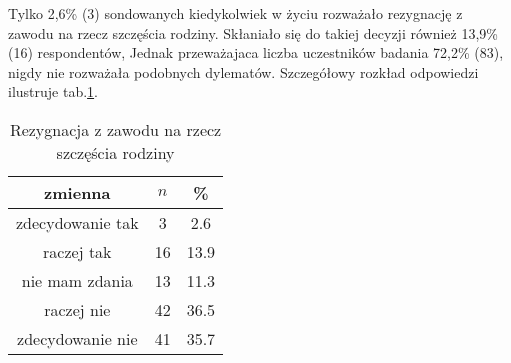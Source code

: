 




Tylko 2,6\%  (3) sondowanych kiedykolwiek w życiu rozważało rezygnację z zawodu na rzecz szczęścia rodziny. Skłaniało się do takiej decyzji również 13,9\% (16) respondentów, Jednak przeważajaca liczba uczestników badania 72,2\% (83), nigdy nie rozważała podobnych dylematów. Szczegółowy rozkład odpowiedzi ilustruje  tab.\ref{tab:Q30}.
\begin{table}[H]
\caption{Rezygnacja z zawodu na rzecz szczęścia rodziny}
\centering
\begin{tabular}{ | c | c | c |}
\hline
zmienna & $n$ & \% \\
\hline
zdecydowanie tak  &  3  & 2.6 \\
\hline
raczej tak  &  16  & 13.9\\
\hline
nie mam zdania  &  13  & 11.3 \\
\hline
raczej nie  &  42  & 36.5\\
\hline
zdecydowanie nie  &  41  & 35.7\\
\hline
\end{tabular}
\label{tab:Q30}
\end{table}
